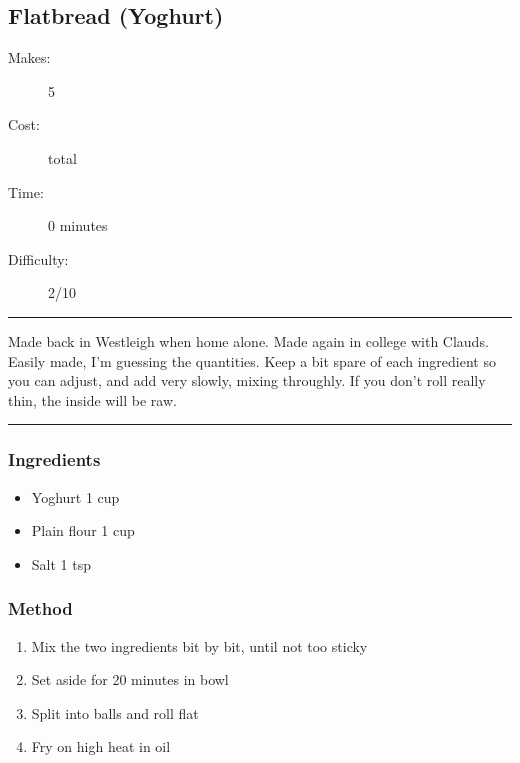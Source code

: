 \documentclass[]{article}
\begin{document}
\subsection*{\center\huge Flatbread (Yoghurt)}
\begin{description}
\item[Makes:] 5 
\item[Cost:]  total
\item[Time:] 0 minutes
\item[Difficulty:] 2/10
\end{description}
\vspace{0.2cm}\hrule\vspace{0.5cm}
\begin{adjustwidth}{0.5 cm}{0.5 cm}

Made back in Westleigh when home alone. Made again in college with Clauds. Easily made, I'm guessing the quantities. Keep a bit spare of each ingredient so you can adjust, and add very slowly, mixing throughly. If you don't roll really thin, the inside will be raw.  \hfill{}\color{black}

\end{adjustwidth}
\vspace{0.5cm}\hrule
\subsubsection*{\Large Ingredients}
\begin{multicols}{2}
\begin{itemize}
 \item Yoghurt \hfill 1 cup
 \item Plain flour \hfill 1 cup
 \item Salt \hfill 1 tsp
\end{itemize}
\end{multicols}
\subsubsection*{\Large Method}
\begin{enumerate}[font=\huge\color{accent}]
	\item Mix the two ingredients bit by bit, until not too sticky
	\item Set aside for 20 minutes in bowl
	\item Split into balls and roll flat
	\item Fry on high heat in oil
\end{enumerate}
\newpage
{}\label{rec:Pizza Dough}
\end{document}
